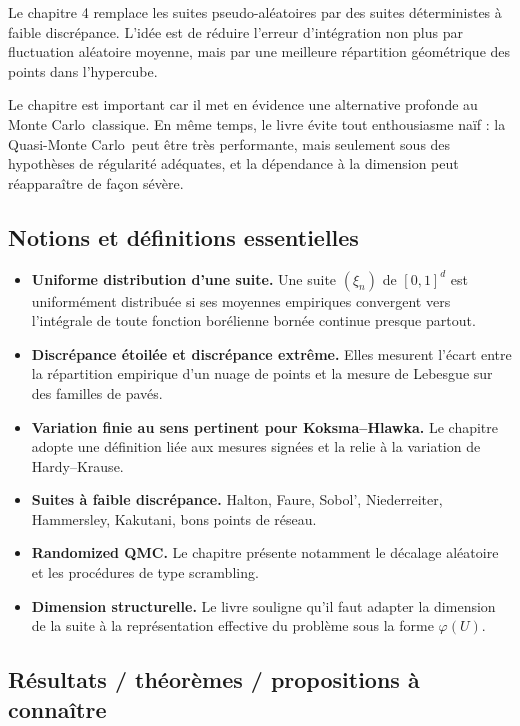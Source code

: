 \documentclass[11pt,a4paper]{article}
\newcommand{\mc}{Monte Carlo}
\newcommand{\qmc}{Quasi-Monte Carlo}
\begin{document}
Le chapitre 4 remplace les suites pseudo-aléatoires par des suites déterministes à faible discrépance. L'idée est de réduire l'erreur d'intégration non plus par fluctuation aléatoire moyenne, mais par une meilleure répartition géométrique des points dans l'hypercube.

Le chapitre est important car il met en évidence une alternative profonde au \mc\ classique. En même temps, le livre évite tout enthousiasme naïf : la \qmc\ peut être très performante, mais seulement sous des hypothèses de régularité adéquates, et la dépendance à la dimension peut réapparaître de façon sévère.

\subsection{Notions et définitions essentielles}

\begin{itemize}
  \item \textbf{Uniforme distribution d'une suite.} Une suite $(\xi_n)$ de $[0,1]^d$ est uniformément distribuée si ses moyennes empiriques convergent vers l'intégrale de toute fonction borélienne bornée continue presque partout.
  \item \textbf{Discrépance étoilée et discrépance extrême.} Elles mesurent l'écart entre la répartition empirique d'un nuage de points et la mesure de Lebesgue sur des familles de pavés.
  \item \textbf{Variation finie au sens pertinent pour Koksma--Hlawka.} Le chapitre adopte une définition liée aux mesures signées et la relie à la variation de Hardy--Krause.
  \item \textbf{Suites à faible discrépance.} Halton, Faure, Sobol', Niederreiter, Hammersley, Kakutani, bons points de réseau.
  \item \textbf{Randomized QMC.} Le chapitre présente notamment le décalage aléatoire et les procédures de type scrambling.
  \item \textbf{Dimension structurelle.} Le livre souligne qu'il faut adapter la dimension de la suite à la représentation effective du problème sous la forme $\varphi(U)$.
\end{itemize}

\subsection{Résultats / théorèmes / propositions à connaître}
\end{document}
